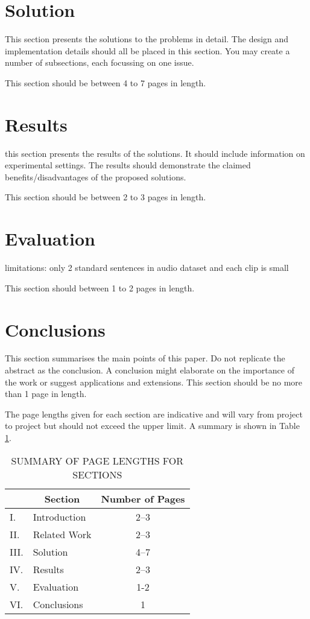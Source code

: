 \documentclass[12pt,a4paper]{article}
\begin{document}
\section{Solution}

This section presents the solutions to the problems in detail.  The design and implementation details should all be placed in this section.  You may create a number of subsections, each focussing on one issue.  

This section should be between 4 to 7 pages in length.

\section{Results}

this section presents the results of the solutions.  It should include information on experimental settings.  The results should demonstrate the claimed benefits/disadvantages of the proposed solutions.

This section should be between 2 to 3 pages in length.

\section{Evaluation}
limitations: only 2 standard sentences in audio dataset and each clip is small

This section should between 1 to 2 pages in length.

\section{Conclusions}

This section summarises the main points of this paper.  Do not replicate the abstract as the conclusion.  A conclusion might elaborate on the importance of the work or suggest applications and extensions.  This section should be no more than 1 page in length.

The page lengths given for each section are indicative and will vary from project to project but should not exceed the upper limit.  A summary is shown in Table \ref{summary}.

\begin{table}[htb]
	\centering
	\caption{SUMMARY OF PAGE LENGTHS FOR SECTIONS}
	\vspace*{6pt}
	\label{summary}
	\begin{tabular}{|ll|c|} \hline
		& \multicolumn{1}{c|}{\bf Section} & {\bf Number of Pages} \\ \hline
		I. & Introduction & 2--3 \\ \hline
		II. & Related Work & 2--3 \\ \hline
		III. & Solution & 4--7 \\ \hline
		IV. & Results & 2--3 \\ \hline
		V. & Evaluation & 1-2 \\ \hline
		VI. & Conclusions & 1 \\ \hline
	\end{tabular}
\end{table}



\end{document}
